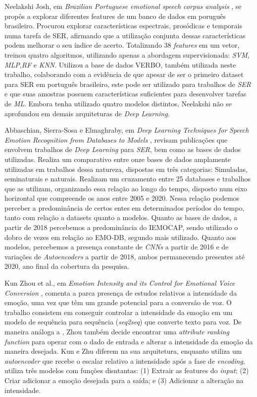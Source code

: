 Neelakshi Josh, em \textit{Brazilian Portuguese emotional speech corpus analysis} \cite{20}, se propôs a explorar diferentes features de um banco de dados em poruguês brasileiro. Procurou explorar características espectrais, prosódicas e temporais numa tarefa de SER, afirmando que a utilização conjunta dessas características podem melhorar o seu índice de acerto. Totalizando 38 \textit{features} em um vetor, treinou quatro algoritmos, utilizando apenas a abordagem supervisionada: \textit{SVM}, \textit{MLP},\textit{RF} e \textit{KNN}. Utilizou a base de dados VERBO, também utilizada neste trabalho, colaborando com a evidência de que apesar de ser o primeiro dataset para SER em português brasileiro, este pode ser utilizado para trabalhos de \textit{SER} e que suas amostras possuem características suficientes para desenvolver tarefas de \textit{ML}. Embora tenha utilizado quatro modelos distintos, Neelakshi não se aprofundou em demais arquiteturas de \textit{Deep Learning}.

Abbaschian, Sierra-Sosa e Elmaghraby, em \textit{Deep Learning Techniques for Speech Emotion Recognition from Databases to Models} \cite{32}, revisam publicações que envolvem trabalhos de \textit{Deep Learning} para \textit{SER}, bem como as bases de dados utilizadas. Realiza um comparativo entre onze bases de dados amplamente utilizadas em trabalhos dessa natureza, dispostas em três categorias: Simuladas, seminaturais e naturais. Realizam um cruzamento entre 25 databases e trabalhos que as utilizam, organizando essa relação ao longo do tempo, disposto num eixo horizontal que compreende os anos entre 2005 e 2020. Nessa relação podemos perceber a predominância de certos entes em determinados períodos do tempo, tanto com relação a datasets quanto a modelos. Quanto as bases de dados, a partir de 2018 percebemos a predominância do IEMOCAP, sendo utilizado o dobro de vezes em relação ao EMO-DB, segundo mais utilizado. Quanto aos modelos, percebemos a presença constante de \textit{CNNs} a partir de 2016 e de variações de \textit{Autoencoders} a partir de 2018, ambos permanecendo presentes até 2020, ano final da cobertura da pesquisa.

Kun Zhou et al., em \textit{Emotion Intensity and its Control for Emotional Voice Conversion }\cite{18}, comenta a parca presença de estudos relativos a intensidade da emoção, uma vez que têm um grande potencial para a conversão de voz. O trabalho consistem em conseguir controlar a intensidade da emoção em um modelo de sequência para sequência (\textit{seq2seq}) que converte texto para voz. De maneira análoga a \cite{63}, Zhou também decide encontrar uma \textit{attribute ranking function} para operar com o dado de entrada e alterar a intensidade da emoção da maneira desejada. Kun \cite{18} e Zhu \cite{63} diferem na sua arquitetura, enquanto \cite{63} utiliza um \textit{autoencoder} que recebe o escalar relativo a intensidade após a fase de \textit{encoding}, \cite{18} utiliza três modelos com funções disntantas: (1) Extrair as features do \textit{input}; (2) Criar adicionar a emoção desejada para a saída; e (3) Adicionar a alteração na intensidade.

